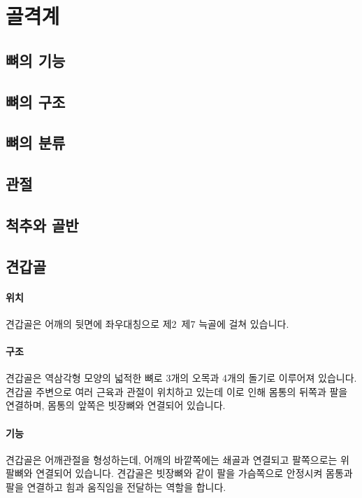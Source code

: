 \documentclass[12pt, a4paper, oneside]{book}
\let\stdsection\section
\renewcommand\section{\newpage\stdsection}
\begin{document}
	\section{골격계}
	
	\subsection{뼈의 기능}
	
	\subsection{뼈의 구조}
	
	\subsection{뼈의 분류}
	
	
	\subsection{관절}
	
	
	\subsection{척추와 골반}
	
	
	\subsection{견갑골}
	
	\paragraph{위치}
			견갑골은 어깨의 뒷면에 좌우대칭으로 제2~제7 늑골에 걸쳐 있습니다.

	\paragraph{구조}
			견갑골은 역삼각형 모양의 넓적한 뼈로 3개의 오목과 4개의 돌기로 이루어져 있습니다. 
			견갑골 주변으로 여러 근육과 관절이 위치하고 있는데 이로 인해 몸통의 뒤쪽과 팔을 연결하며, 몸통의 앞쪽은 빗장뼈와 연결되어 있습니다. 

	\paragraph{기능}
			견갑골은 어깨관절을 형성하는데, 어깨의 바깥쪽에는 쇄골과 연결되고 팔쪽으로는 위 팔뼈와 연결되어 있습니다. 
			견갑골은 빗장뼈와 같이 팔을 가슴쪽으로 안정시켜 몸통과 팔을 연결하고 힘과 움직임을 전달하는 역할을 합니다. 
\end{document}
